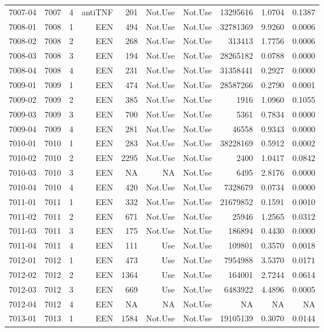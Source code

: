 {\begin{longtable}{ | r | r | r | r | r | r | r | r | r | r | }
7007-04 & 7007 & 4 & antiTNF & 201 & Not.Use & Not.Use & 13295616 & 1.0704 & 0.1387\\ 
7008-01 & 7008 & 1 & EEN & 494 & Not.Use & Not.Use & 32781369 & 9.9260 & 0.0006\\ 
7008-02 & 7008 & 2 & EEN & 268 & Not.Use & Not.Use & 313413 & 1.7756 & 0.0006\\ 
7008-03 & 7008 & 3 & EEN & 194 & Not.Use & Not.Use & 28265182 & 0.0788 & 0.0000\\ 
7008-04 & 7008 & 4 & EEN & 231 & Not.Use & Not.Use & 31358441 & 0.2927 & 0.0000\\ 
7009-01 & 7009 & 1 & EEN & 474 & Not.Use & Not.Use & 28587266 & 0.2790 & 0.0001\\ 
7009-02 & 7009 & 2 & EEN & 385 & Not.Use & Not.Use & 1916 & 1.0960 & 0.1055\\ 
7009-03 & 7009 & 3 & EEN & 700 & Not.Use & Not.Use & 5361 & 0.7834 & 0.0000\\ 
7009-04 & 7009 & 4 & EEN & 281 & Not.Use & Not.Use & 46558 & 0.9343 & 0.0000\\ 
7010-01 & 7010 & 1 & EEN & 283 & Not.Use & Not.Use & 38228169 & 0.5912 & 0.0002\\ 
7010-02 & 7010 & 2 & EEN & 2295 & Not.Use & Not.Use & 2400 & 1.0417 & 0.0842\\ 
7010-03 & 7010 & 3 & EEN & NA & NA & Not.Use & 6495 & 2.8176 & 0.0000\\ 
7010-04 & 7010 & 4 & EEN & 420 & Not.Use & Not.Use & 7328679 & 0.0734 & 0.0000\\ 
7011-01 & 7011 & 1 & EEN & 332 & Not.Use & Not.Use & 21679852 & 0.1591 & 0.0010\\ 
7011-02 & 7011 & 2 & EEN & 671 & Not.Use & Not.Use & 25946 & 1.2565 & 0.0312\\ 
7011-03 & 7011 & 3 & EEN & 175 & Not.Use & Not.Use & 186894 & 0.4430 & 0.0000\\ 
7011-04 & 7011 & 4 & EEN & 111 & Use & Not.Use & 109801 & 0.3570 & 0.0018\\ 
7012-01 & 7012 & 1 & EEN & 473 & Use & Not.Use & 7954988 & 3.5370 & 0.0171\\ 
7012-02 & 7012 & 2 & EEN & 1364 & Use & Not.Use & 164001 & 2.7244 & 0.0614\\ 
7012-03 & 7012 & 3 & EEN & 669 & Use & Not.Use & 6483922 & 4.4896 & 0.0005\\ 
7012-04 & 7012 & 4 & EEN & NA & NA & Not.Use & NA & NA & NA\\ 
7013-01 & 7013 & 1 & EEN & 1584 & Not.Use & Not.Use & 19105139 & 0.3070 & 0.0144\\ 

\end{longtable}}
